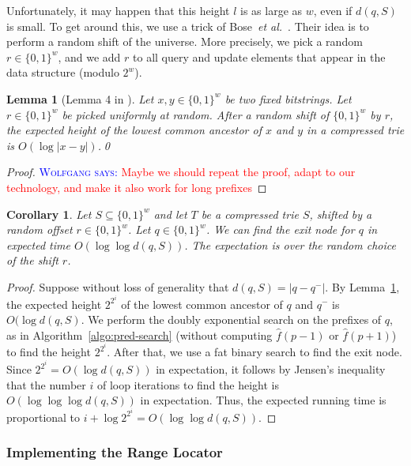 \documentclass[a4paper,11pt]{article}
\newtheorem{lemma}[theorem]{Lemma}
\newtheorem{corollary}[theorem]{Corollary}
\newcommand{\etal}{\emph{et al.}\xspace}
\newcommand{\?}{\mskip1.5mu}
\newcommand{\aremark}[3]{\textcolor{blue}{\textsc{#1 #2:}}
  \textcolor{red}{\textsf{#3}}}
\newcommand{\wolfgang}[2][says]{\aremark{Wolfgang}{#1}{#2}}
\begin{document}
Unfortunately, it may happen that this height $l$ is as large as $w$,
even if $d(q, S)$ is small.
To get around this, we use a trick of Bose~\etal~\cite{BoseDoDuHoMo13}.
Their idea is to perform a random shift of the universe. 
More precisely, we pick a random $r \in \{0, 1\}^w$, and we
add $r$ to all query and update elements that appear in 
the data structure (modulo $2^w$).

\begin{lemma}[Lemma 4 in \cite{BoseDoDuHoMo13}]
\label{lemma:delta_lca_loglog_delta}
Let $x, y \in \{0, 1\}^w$ be two fixed bitstrings.
Let $r \in \{0, 1\}^w$ be picked uniformly at random.
After a random shift of $\{0, 1\}^w$ by $r$, the 
expected height of the lowest common ancestor of 
$x$ and $y$ in a compressed trie is $O(\log|x - y|)$.\qed
\end{lemma}

\begin{proof}
\wolfgang{Maybe we should repeat the proof, adapt to our technology,
and make it also work for long prefixes}
\end{proof}

\begin{corollary}
\label{cor:delta_fast_expected_lca}
Let $S \subseteq \{0, 1\}^w$ and let $T$ be 
a compressed trie $S$, shifted by a random offset
$r \in \{0, 1\}^w$.
Let $q \in \{0, 1\}^w$. 
We can find the exit node for $q$  in expected time $O(\log\log d(q, S))$.
The expectation is
over the random choice of the shift $r$. 
\end{corollary}

\begin{proof}
Suppose without loss of generality that $d(q, S) = |q - q^-|$.
By Lemma~\ref{lemma:delta_lca_loglog_delta},
the expected height $2^{2^i}$ of the lowest common ancestor of $q$ and $q^-$
is $O(\log d(q, S)$.
We perform the doubly exponential
search on the prefixes of $q$, as in Algorithm~\ref{algo:pred-search}
(without computing $\widehat f (p - 1)$ or $\widehat f (p + 1)$) 
to find the height $2^{2^i}$. After
that, we  use a fat binary search to find the
exit node.
Since $2^{2^i} = O(\log d(q, S))$ in expectation,
it follows by Jensen's inequality that the number $i$
of loop iterations to find  the height is $O(\log\log\log d(q, S))$
in expectation. Thus, the expected running time is proportional to
$i + \log 2^{2^i} = O(\log\log d(q, S))$. 
\end{proof}

\subsubsection{Implementing the Range Locator}
\end{document}
